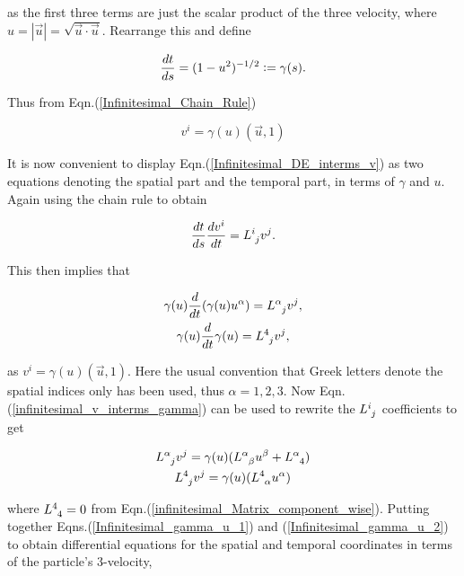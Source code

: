 \noindent as the first three terms are just the scalar product of the three velocity, where $u = |\vec{u}| = \sqrt{\vec{u} \cdot \vec{u}}$. Rearrange this and define

\begin{equation*}
\frac{dt}{ds} = (1-u^2)^{-1/2} \vcentcolon = \gamma (s).
\end{equation*}

\noindent Thus from Eqn.(\ref{Infinitesimal_Chain_Rule})

\begin{equation}\label{infinitesimal_v_interms_gamma}
v^i = \gamma(u) (\vec{u}, 1)
\end{equation}

\noindent It is now convenient to display Eqn.(\ref{Infinitesimal_DE_interms_v}) as two equations denoting the spatial part and the temporal part, in terms of $\gamma$ and $u$. Again using the chain rule to obtain

\begin{equation*} 
\frac{dt}{ds} \frac{dv^i}{dt} = \tensor{L}{^{i}_{j}}v^j. 
\end{equation*} 

\noindent This then implies that 

\begin{gather}\label{Infinitesimal_gamma_u_1}
\gamma(u) \frac{d}{dt} (\gamma(u) u^{\alpha}) = \tensor{L}{^{\alpha}_{j}} v^j, \\\nonumber
\gamma(u) \frac{d}{dt} \gamma(u) = \tensor{L}{^{4}_{j}} v^j,
\end{gather}

\noindent as $v^i = \gamma(u)(\vec{u},1)$. Here the usual convention that Greek letters denote the spatial indices only has been used, thus $\alpha = 1,2,3$. Now Eqn.(\ref{infinitesimal_v_interms_gamma}) can be used to rewrite the $\tensor{L}{^{i}_{j}}$ coefficients to get

\begin{gather}\label{Infinitesimal_gamma_u_2}
\tensor{L}{^{\alpha}_{j}} v^j = \gamma(u) (\tensor{L}{^{\alpha}_{\beta}} u^{\beta} + \tensor{L}{^{\alpha}_4}) \\ \nonumber
\tensor{L}{^{4}_{j}} v^j = \gamma(u) (\tensor{L}{^{4}_{\alpha}} u^{\alpha})
\end{gather} 

\noindent where $\tensor{L}{^{4}_{4}} = 0$ from Eqn.(\ref{infinitesimal_Matrix_component_wise}). Putting together Eqns.(\ref{Infinitesimal_gamma_u_1}) and (\ref{Infinitesimal_gamma_u_2}) to obtain differential equations for the spatial and temporal coordinates in terms of the particle's $3$-velocity,

